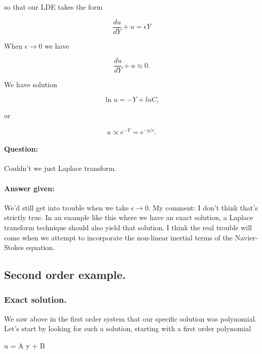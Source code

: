 so that our LDE takes the form

\begin{equation}\label{eqn:continuumL20:230}
\frac{du}{dY} + u = \epsilon Y
\end{equation}

When $\epsilon \rightarrow 0$ we have

\begin{equation}\label{eqn:continuumL20:250}
\frac{du}{dY} + u \approx 0.
\end{equation}

We have solution

\begin{equation}\label{eqn:continuumL20:270}
\ln u = -Y + ln C,
\end{equation}

or

\begin{equation}\label{eqn:continuumL20:290}
u \propto e^{-Y} = e^{-y/\epsilon}.
\end{equation}

\paragraph{Question:} Couldn't we just Laplace transform.
\paragraph{Answer given:} We'd still get into trouble when we take $\epsilon \rightarrow 0$.  My comment: I don't think that's strictly true.  In an example like this where we have an exact solution, a Laplace transform technique should also yield that solution.  I think the real trouble will come when we attempt to incorporate the non-linear inertial terms of the Navier-Stokes equation.

\subsection{Second order example.}

\subsubsection{Exact solution.}

We saw above in the first order system that our specific solution was polynomial.  Let's start by looking for such a solution, starting with a first order polynomial

u = A y + B

